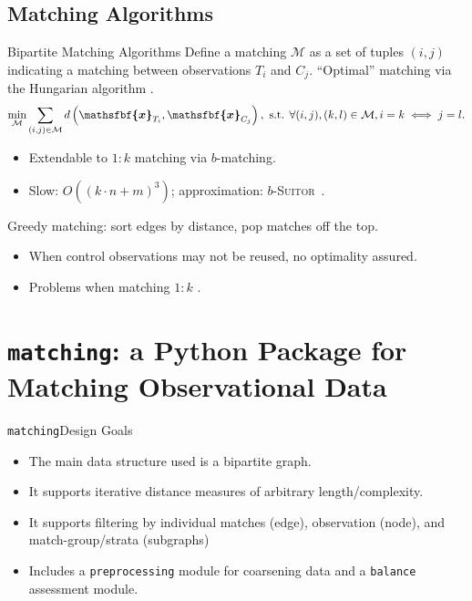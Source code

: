 \documentclass[11pt, compress]{beamer}
\renewcommand{\vec}[1]{\ensuremath{\boldsymbol{\mathsfbf{#1}}}}
\newcommand{\set}[1]{\ensuremath{\mathcal{#1}}}
\begin{document}
\subsection{Matching Algorithms}
\begin{frame}{Bipartite Matching Algorithms}{}
	Define a matching $\set{M}$ as a set of tuples $(i, j)$ indicating a matching between observations $T_i$ and $C_j$. 
	``Optimal'' matching via the Hungarian algorithm \parencite{munkres_algorithms_1957}.
	\begin{equation}
		\min _{\mathcal{M}} \sum_{(i, j) \in \mathcal{M}} d\left(\vec{x}_{T_{i}}, \vec{x}_{C_{j}}\right), \text { s.t. } \forall(i, j),(k, l) \in \mathcal{M}, i=k \iff j=l.
	\end{equation}
	\begin{itemize}
		\item Extendable to $1:k$ matching via $b$-matching.
		\item Slow: $O((k \cdot n + m)^3)$; approximation: $b$-\textsc{Suitor}~\parencite{khan_efficient_2016}.
	\end{itemize}

	Greedy matching: sort edges by distance, pop matches off the top.
	\begin{itemize}
		\item When control observations may not be reused, no optimality assured.
		\item Problems when matching $1:k$ \parencite{rosenbaum_optimal_1989}.
	\end{itemize}
\end{frame}


\section{\texttt{matching}: a Python Package for Matching Observational Data}
\begin{frame}{\texttt{matching}}{Design Goals}
	\begin{itemize}
		\item The main data structure used is a bipartite graph.
		\item It supports iterative distance measures of arbitrary length/complexity.
		\item It supports filtering by individual matches (edge), observation (node), and match-group/strata (subgraphs)
		\item Includes a \texttt{preprocessing} module for coarsening data and a \texttt{balance} assessment module.
	\end{itemize}
\end{frame}
\end{document}
